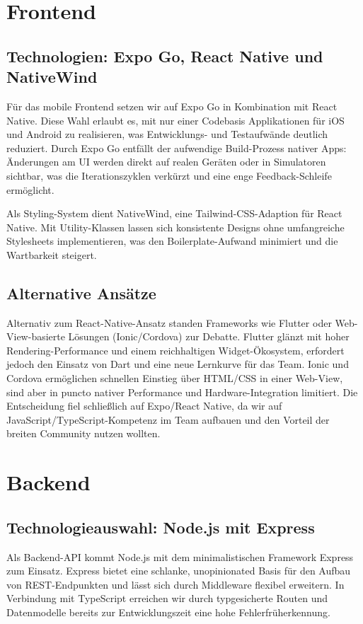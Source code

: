 \documentclass[12pt, a4paper]{report} %
\begin{document}
\section{Frontend}
\subsection{Technologien: Expo Go, React Native und NativeWind}
Für das mobile Frontend setzen wir auf Expo Go in Kombination mit React Native. Diese Wahl erlaubt es, mit nur einer Codebasis Applikationen für iOS und Android zu realisieren, was Entwicklungs- und Testaufwände deutlich reduziert. Durch Expo Go entfällt der aufwendige Build-Prozess nativer Apps: Änderungen am UI werden direkt auf realen Geräten oder in Simulatoren sichtbar, was die Iterationszyklen verkürzt und eine enge Feedback-Schleife ermöglicht.

Als Styling-System dient NativeWind, eine Tailwind-CSS-Adaption für React Native. Mit Utility-Klassen lassen sich konsistente Designs ohne umfangreiche Stylesheets implementieren, was den Boilerplate-Aufwand minimiert und die Wartbarkeit steigert.

\subsection{Alternative Ansätze}
Alternativ zum React-Native-Ansatz standen Frameworks wie Flutter oder Web-View-basierte Lösungen (Ionic/Cordova) zur Debatte. Flutter glänzt mit hoher Rendering-Performance und einem reichhaltigen Widget-Ökosystem, erfordert jedoch den Einsatz von Dart und eine neue Lernkurve für das Team. Ionic und Cordova ermöglichen schnellen Einstieg über HTML/CSS in einer Web-View, sind aber in puncto nativer Performance und Hardware-Integration limitiert. Die Entscheidung fiel schließlich auf Expo/React Native, da wir auf JavaScript/TypeScript-Kompetenz im Team aufbauen und den Vorteil der breiten Community nutzen wollten.

\section{Backend}
\subsection{Technologieauswahl: Node.js mit Express}
Als Backend-API kommt Node.js mit dem minimalistischen Framework Express zum Einsatz. Express bietet eine schlanke, unopinionated Basis für den Aufbau von REST-Endpunkten und lässt sich durch Middleware flexibel erweitern. In Verbindung mit TypeScript erreichen wir durch typgesicherte Routen und Datenmodelle bereits zur Entwicklungszeit eine hohe Fehlerfrüherkennung.
\end{document}

